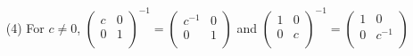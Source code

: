 \begin{example}
\begin{enumerate}
        \item[(4)] For $c \neq 0$, $\begin{pmatrix}
                    c & 0 \\
                    0 & 1 \\
            \end{pmatrix}^{-1}=
            \begin{pmatrix}
                     c^{-1} & 0 \\
                         0 & 1 \\
            \end{pmatrix}$ and
            $\begin{pmatrix}
                    1 & 0 \\
                    0 & c \\
            \end{pmatrix}^{-1}=
            \begin{pmatrix}
                     1 & 0 \\
                     0 & c^{-1} \\
            \end{pmatrix}$
    \end{enumerate}		
\end{example} 

